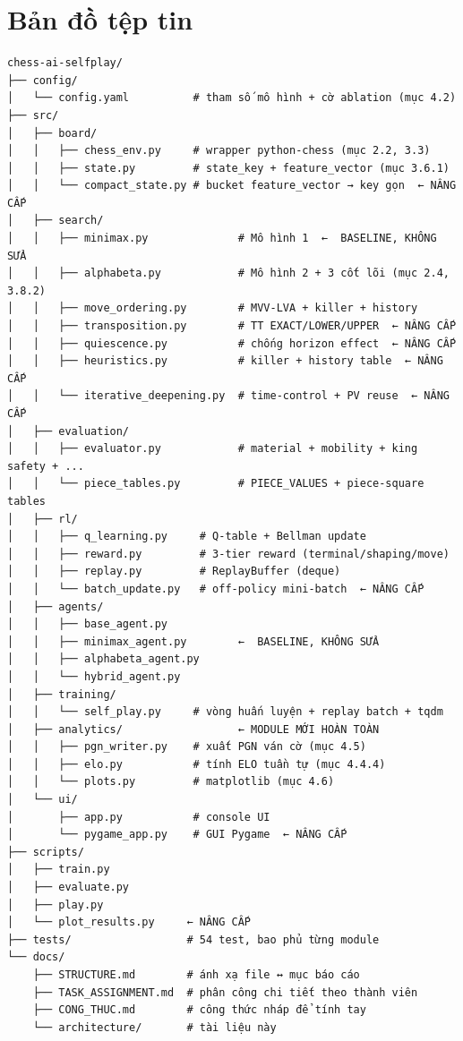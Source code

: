 \documentclass[11pt,a4paper]{article}
\begin{document}
\clearpage
\section{Bản đồ tệp tin}

{\small
\begin{verbatim}
chess-ai-selfplay/
├── config/
│   └── config.yaml          # tham số mô hình + cờ ablation (mục 4.2)
├── src/
│   ├── board/
│   │   ├── chess_env.py     # wrapper python-chess (mục 2.2, 3.3)
│   │   ├── state.py         # state_key + feature_vector (mục 3.6.1)
│   │   └── compact_state.py # bucket feature_vector → key gọn  ← NÂNG CẤP
│   ├── search/
│   │   ├── minimax.py              # Mô hình 1  ←  BASELINE, KHÔNG SỬA
│   │   ├── alphabeta.py            # Mô hình 2 + 3 cốt lõi (mục 2.4, 3.8.2)
│   │   ├── move_ordering.py        # MVV-LVA + killer + history
│   │   ├── transposition.py        # TT EXACT/LOWER/UPPER  ← NÂNG CẤP
│   │   ├── quiescence.py           # chống horizon effect  ← NÂNG CẤP
│   │   ├── heuristics.py           # killer + history table  ← NÂNG CẤP
│   │   └── iterative_deepening.py  # time-control + PV reuse  ← NÂNG CẤP
│   ├── evaluation/
│   │   ├── evaluator.py            # material + mobility + king safety + ...
│   │   └── piece_tables.py         # PIECE_VALUES + piece-square tables
│   ├── rl/
│   │   ├── q_learning.py     # Q-table + Bellman update
│   │   ├── reward.py         # 3-tier reward (terminal/shaping/move)
│   │   ├── replay.py         # ReplayBuffer (deque)
│   │   └── batch_update.py   # off-policy mini-batch  ← NÂNG CẤP
│   ├── agents/
│   │   ├── base_agent.py
│   │   ├── minimax_agent.py        ←  BASELINE, KHÔNG SỬA
│   │   ├── alphabeta_agent.py
│   │   └── hybrid_agent.py
│   ├── training/
│   │   └── self_play.py     # vòng huấn luyện + replay batch + tqdm
│   ├── analytics/                  ← MODULE MỚI HOÀN TOÀN
│   │   ├── pgn_writer.py    # xuất PGN ván cờ (mục 4.5)
│   │   ├── elo.py           # tính ELO tuần tự (mục 4.4.4)
│   │   └── plots.py         # matplotlib (mục 4.6)
│   └── ui/
│       ├── app.py           # console UI
│       └── pygame_app.py    # GUI Pygame  ← NÂNG CẤP
├── scripts/
│   ├── train.py
│   ├── evaluate.py
│   ├── play.py
│   └── plot_results.py     ← NÂNG CẤP
├── tests/                  # 54 test, bao phủ từng module
└── docs/
    ├── STRUCTURE.md        # ánh xạ file ↔ mục báo cáo
    ├── TASK_ASSIGNMENT.md  # phân công chi tiết theo thành viên
    ├── CONG_THUC.md        # công thức nháp để tính tay
    └── architecture/       # tài liệu này
\end{verbatim}
}
\end{document}
